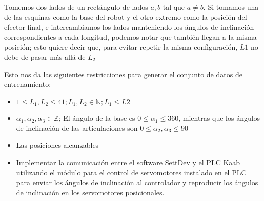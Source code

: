 Tomemos dos lados de un rectángulo de lados $a,b$ tal que $a \neq b$. Si tomamos una de las esquinas como la base del robot y el otro extremo como la posición del efector final, e intercambiamos los lados manteniendo los ángulos de inclinación correspondientes a cada longitud, podemos notar que también llegan a la misma posición; esto quiere decir que, para evitar repetir la misma configuración, $L1$ no debe de pasar más allá de $L_2$

Esto nos da las siguientes restricciones para generar el conjunto de datos de entrenamiento:

\begin{itemize}
	
	\item $ 1 \leq L_1, L_2 \leq 41; L_1, L_2 \in \mathbb{N}; L_1 \leq L2$ 
	
	\item $\alpha_1, \alpha_2, \alpha_3 \in \mathbb{Z}$; El ángulo de la base es $ 0 \leq \alpha_1 \leq 360$, mientras que los ángulos de inclinación de las articulaciones son $ 0 \leq \alpha_2, \alpha_3 \leq 90$
	
	\item Las posiciones alcanzables 
	
	\item Implementar la comunicación entre el software SettDev y el PLC Kaab utilizando el módulo para el control de servomotores instalado en el PLC para enviar los ángulos de inclinación al controlador y reproducir los ángulos de inclinación en los servomotores posicionales.
	
\end{itemize}